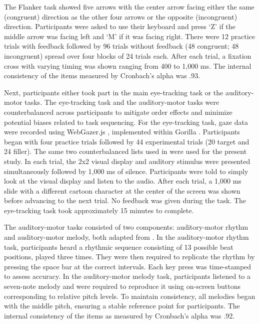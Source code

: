 The Flanker task showed five arrows with the center arrow facing either the same (congruent) direction as the other four arrows or the opposite (incongruent) direction. Participants were asked to use their keyboard and press ‘Z’ if the middle arrow was facing left and ‘M’ if it was facing right. There were 12 practice trials with feedback followed by 96 trials without feedback (48 congruent; 48 incongruent) spread over four blocks of 24 trials each. After each trial, a fixation cross with varying timing was shown ranging from 400 to 1,000 ms. The internal consistency of the items measured by Cronbach’s alpha was .93.

Next, participants either took part in the main eye-tracking task or the auditory-motor tasks. The eye-tracking task and the auditory-motor tasks were counterbalanced across participants to mitigate order effects and minimize potential biases related to task sequencing. For the eye-tracking task, gaze data were recorded using WebGazer.js \citep{Papoutsaki}, implemented within Gorilla \citep{Anwyl-Irvine_2019}. Participants began with four practice trials followed by 44 experimental trials (20 target and 24 filler). The same two counterbalanced lists used in \cite{Ge2021} were used for the present study. In each trial, the 2x2 visual display and auditory stimulus were presented simultaneously followed by 1,000 ms of silence. Participants were told to simply look at the visual display and listen to the audio. After each trial, a 1,000 ms slide with a different cartoon character at the center of the screen was shown before advancing to the next trial. No feedback was given during the task. The eye-tracking task took approximately 15 minutes to complete.

The auditory-motor tasks consisted of two components: auditory-motor rhythm and auditory-motor melody, both adapted from \citep{Kachlicka_Saito_Tierney_2019}. In the auditory-motor rhythm task, participants heard a rhythmic sequence consisting of 13 possible beat positions, played three times. They were then required to replicate the rhythm by pressing the space bar at the correct intervals. Each key press was time-stamped to assess accuracy. In the auditory-motor melody task, participants listened to a seven-note melody and were required to reproduce it using on-screen buttons corresponding to relative pitch levels. To maintain consistency, all melodies began with the middle pitch, ensuring a stable reference point for participants. The internal consistency of the items as measured by Cronbach's alpha was .92.

